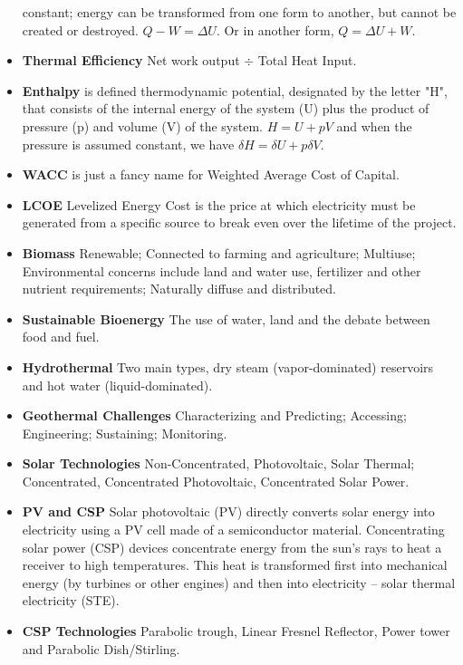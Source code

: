 \documentclass[twocolumn]{article}
\begin{document}
\begin{itemize}
  constant; energy can be transformed from one form to another, but
  cannot be created or destroyed. $Q-W=\Delta U$. Or in another form,
  $Q=\Delta U+W$.
\item \textbf{Thermal Efficiency} Net work output $\div$ Total Heat
  Input.
\item \textbf{Enthalpy} is defined thermodynamic potential, designated
  by the letter "H", that consists of the internal energy of the
  system (U) plus the product of pressure (p) and volume (V) of the
  system. $H=U+pV$ and when the pressure is assumed constant, we have
  $\delta H=\delta U+p\delta V$.
\item \textbf{WACC} is just a fancy name for Weighted Average Cost of
  Capital. 
\item \textbf{LCOE} Levelized Energy Cost is the price at which
  electricity must be generated from a specific source to break even
  over the lifetime of the project.
\item \textbf{Biomass} Renewable; Connected to farming and
  agriculture; Multiuse; Environmental concerns include land and water
  use, fertilizer and other nutrient requirements; Naturally diffuse
  and distributed. 
\item \textbf{Sustainable Bioenergy} The use of water, land and the
  debate between food and fuel.
\item \textbf{Hydrothermal} Two main types, dry steam
  (vapor-dominated) reservoirs and hot water (liquid-dominated).
\item \textbf{Geothermal Challenges} Characterizing and Predicting;
  Accessing; Engineering; Sustaining; Monitoring.
\item \textbf{Solar Technologies} Non-Concentrated, Photovoltaic,
  Solar Thermal; Concentrated, Concentrated Photovoltaic, Concentrated
  Solar Power. 
\item \textbf{PV and CSP} Solar photovoltaic (PV) directly converts
  solar energy into electricity using a PV cell made of a
  semiconductor material. Concentrating solar power (CSP) devices
  concentrate energy from the sun’s rays to heat a receiver to high
  temperatures. This heat is transformed first into mechanical energy
  (by turbines or other engines) and then into electricity – solar
  thermal electricity (STE).
\item \textbf{CSP Technologies} Parabolic trough, Linear Fresnel
  Reflector, Power tower and Parabolic Dish/Stirling. 

\end{itemize}
\end{document}
